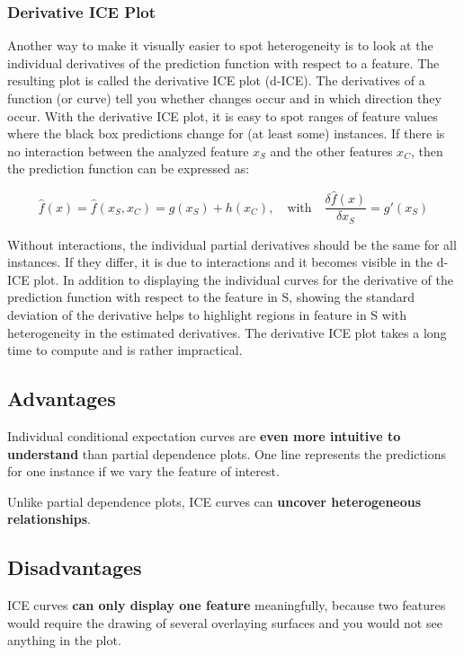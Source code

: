 \documentclass[12pt,]{krantz}
\begin{document}
\subsubsection{Derivative ICE Plot}\label{derivative-ice-plot}

Another way to make it visually easier to spot heterogeneity is to look
at the individual derivatives of the prediction function with respect to
a feature. The resulting plot is called the derivative ICE plot (d-ICE).
The derivatives of a function (or curve) tell you whether changes occur
and in which direction they occur. With the derivative ICE plot, it is
easy to spot ranges of feature values where the black box predictions
change for (at least some) instances. If there is no interaction between
the analyzed feature \(x_S\) and the other features \(x_C\), then the
prediction function can be expressed as:

\[\hat{f}(x)=\hat{f}(x_S,x_C)=g(x_S)+h(x_C),\quad\text{with}\quad\frac{\delta\hat{f}(x)}{\delta{}x_S}=g'(x_S)\]

Without interactions, the individual partial derivatives should be the
same for all instances. If they differ, it is due to interactions and it
becomes visible in the d-ICE plot. In addition to displaying the
individual curves for the derivative of the prediction function with
respect to the feature in S, showing the standard deviation of the
derivative helps to highlight regions in feature in S with heterogeneity
in the estimated derivatives. The derivative ICE plot takes a long time
to compute and is rather impractical.

\subsection{Advantages}\label{advantages-12}

Individual conditional expectation curves are \textbf{even more
intuitive to understand} than partial dependence plots. One line
represents the predictions for one instance if we vary the feature of
interest.

Unlike partial dependence plots, ICE curves can \textbf{uncover
heterogeneous relationships}.

\subsection{Disadvantages}\label{disadvantages-12}

ICE curves \textbf{can only display one feature} meaningfully, because
two features would require the drawing of several overlaying surfaces
and you would not see anything in the plot.
\end{document}
